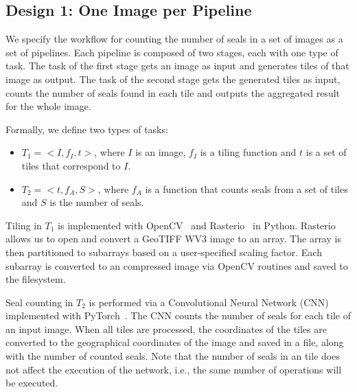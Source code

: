 \subsection{Design 1: One Image per Pipeline}
\label{ssec:approach1}\label{des1}



We specify the workflow for counting the number of seals in a set of images as
a set of pipelines. Each pipeline is composed of two stages, each with one
type of task. The task of the first stage gets an image as input and generates
tiles of that image as output. The task of the second stage gets the generated
tiles as input, counts the number of seals found in each tile and outputs the
aggregated result for the whole image.

Formally, we define two types of tasks:
\begin{itemize}
    \item $T_{1} = <I, f_{I}, t>$, where $I$ is an image, $f_{I}$ is a tiling
    function and $t$ is a set of tiles that correspond to $I$.
    \item $T_{2} = <t, f_{A}, S>$, where $f_{A}$ is a function that counts
    seals from a set of tiles and $S$ is the number of seals.
\end{itemize}


Tiling in $T_{1}$ is implemented with OpenCV~\cite{bradski2000opencv} and
Rasterio~\cite{gillies2013rasterio} in Python. Rasterio allows us to open and
convert a GeoTIFF WV3 image to an array. The array is then partitioned to
sub\-arrays based on a user-specified scaling factor. Each sub\-array is
converted to an compressed image via OpenCV routines and saved to the
filesystem.

Seal counting in $T_{2}$ is performed via a Convolutional Neural Network (CNN)
implemented with PyTorch~\cite{paszke2017automatic}. The CNN counts the number
of seals for each tile of an input image. When all tiles are processed, the
coordinates of the tiles are converted to the geographical coordinates of the
image and saved in a file, along with the number of counted seals. Note that
the number of seals in an tile does not affect the execution of the network,
i.e., the same number of operations will be executed.

